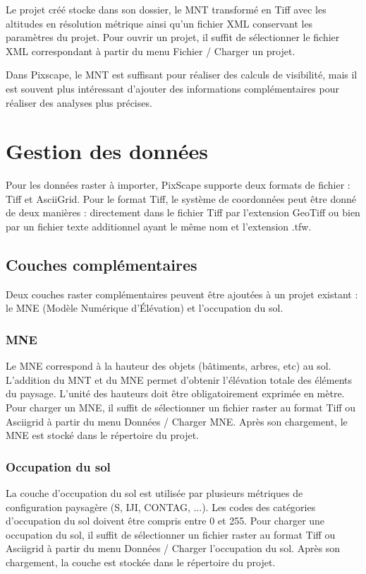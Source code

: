 \documentclass{report}
\begin{document}
Le projet créé stocke dans son dossier, le MNT transformé en Tiff avec les altitudes en résolution métrique ainsi qu'un fichier XML conservant les paramètres du projet.
Pour ouvrir un projet, il suffit de sélectionner le fichier XML correspondant à partir du menu Fichier / Charger un projet.

Dans Pixscape, le MNT est suffisant pour réaliser des calculs de visibilité, mais il est souvent plus intéressant d'ajouter des informations complémentaires pour réaliser des analyses plus précises.

\section{Gestion des données}

Pour les données raster à importer, PixScape supporte deux formats de fichier : Tiff et AsciiGrid. Pour le format Tiff, le système de coordonnées peut être donné de deux manières : directement dans le fichier Tiff par l'extension GeoTiff ou bien par un fichier texte additionnel ayant le même nom et l'extension .tfw. 


\subsection{Couches complémentaires}
Deux couches raster complémentaires peuvent être ajoutées à un projet existant : le MNE (Modèle Numérique d'Élévation) et l'occupation du sol.

\subsubsection{MNE}
Le MNE correspond à la hauteur des objets (bâtiments, arbres, etc) au sol. L'addition du MNT et du MNE permet d'obtenir l'élévation totale des éléments du paysage. L'unité des hauteurs doit être obligatoirement exprimée en mètre. Pour charger un MNE, il suffit de sélectionner un fichier raster au format Tiff ou Asciigrid à partir du menu Données / Charger MNE. Après son chargement, le MNE est stocké dans le répertoire du projet.

\subsubsection{Occupation du sol}
La couche d'occupation du sol est utilisée par plusieurs métriques de configuration paysagère (S, IJI, CONTAG, ...). Les codes des catégories d'occupation du sol doivent être compris entre 0 et 255. Pour charger une occupation du sol, il suffit de sélectionner un fichier raster au format Tiff ou Asciigrid à partir du menu Données / Charger l'occupation du sol. Après son chargement, la couche est stockée dans le répertoire du projet.
\end{document}
